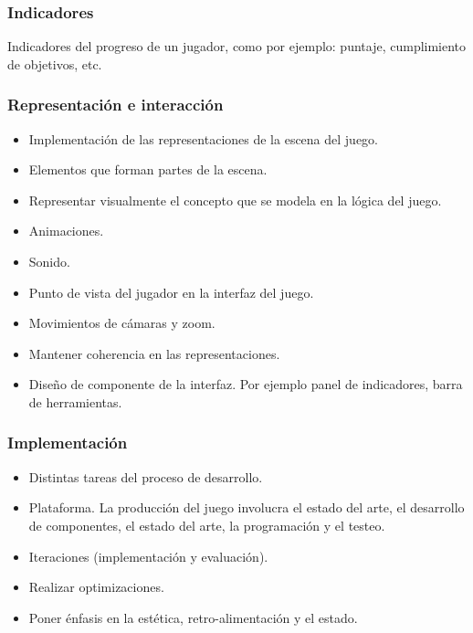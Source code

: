 \subsubsection{Indicadores}
Indicadores del progreso de un jugador, como por ejemplo: puntaje, cumplimiento de objetivos, etc.

\subsubsection{Representación e interacción}
\begin{itemize}
	\item Implementación de las representaciones de la escena del juego.
	\item Elementos que forman partes de la escena.
	\item Representar visualmente el concepto que se modela en la lógica del juego.
	\item Animaciones.
	\item Sonido.
	\item Punto de vista del jugador en la interfaz del juego.
	\item Movimientos de cámaras y zoom.
	\item Mantener coherencia en las representaciones.
	\item Diseño de componente de la interfaz. Por ejemplo panel de indicadores, barra de herramientas.
\end{itemize}

\subsubsection{Implementación} 
\begin{itemize}
	\item Distintas tareas del proceso de desarrollo. 
	\item Plataforma. La producción del juego involucra el estado del arte, el desarrollo de componentes, el estado del arte, la programación y el testeo. 
	\item Iteraciones (implementación y evaluación). 
	\item Realizar optimizaciones. 
	\item Poner énfasis en la estética, retro-alimentación y el estado. 
\end{itemize}

